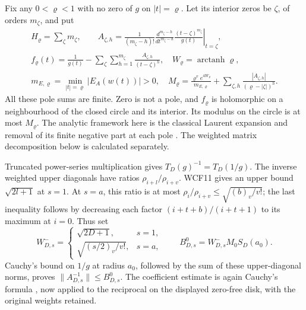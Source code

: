 Fix any $0<\varrho<1$ with no zero of $g$ on $|t|=\varrho$.
Let its interior zeros be $\zeta$, of orders $m_\zeta$, and put
\[
\begin{gathered}
 H_\varrho=\sum_\zeta m_\zeta,\qquad
 A_{\zeta,h}=\frac1{(m_\zeta-h)!}
   \left.\frac{d^{m_\zeta-h}}{dt^{m_\zeta-h}}
       \frac{(t-\zeta)^{m_\zeta}}{g(t)}\right|_{t=\zeta},\\
 f_\varrho(t)=\frac1{g(t)}-
       \sum_{\zeta}\sum_{h=1}^{m_\zeta}\frac{A_{\zeta,h}}{(t-\zeta)^h},
 \quad W_\varrho=\operatorname{arctanh}\varrho,\\
 m_{E,\varrho}=\min_{|t|=\varrho}|E_A(w(t))|>0,\quad
 M_\varrho=\frac{\varrho^ve^{4W_\varrho}}{m_{E,\varrho}}
       +\sum_{\zeta,h}\frac{|A_{\zeta,h}|}{(\varrho-|\zeta|)^h}.
\end{gathered}\tag{WCF15}
\]
All these pole sums are finite. Zero is not a pole, and $f_\varrho$
is holomorphic on a neighbourhood of the closed circle and its
interior. Its modulus on the circle is at most $M_\varrho$.
The analytic framework here is the classical Laurent expansion and
removal of its finite negative part at each pole
\cite[\S1.10(iii), eqs.~(1.10.6)--(1.10.7)]{human:dlmf1}.
The weighted matrix decomposition below is calculated separately.

Truncated power-series multiplication gives
$T_D(g)^{-1}=T_D(1/g)$. The inverse weighted upper diagonals have
ratios $\rho_{i+l}/\rho_{i+v}$. WCF11 gives an upper bound
$\sqrt{2l+1}$ at $s=1$. At $s=a$, this ratio is at most
$\rho_i/\rho_{i+v}\le\sqrt{(b)_v/v!}$; the last inequality follows
by decreasing each factor $(i+t+b)/(i+t+1)$ to its maximum at $i=0$.
Thus set
\[
 W_{D,s}^-=
 \begin{cases}\sqrt{2D+1},&s=1,\\\sqrt{(s/2)_v/v!},&s=a,
 \end{cases}
 \qquad B^0_{D,s}=W_{D,s}^-M_0S_D(a_0).
 \tag{WCF16}
\]
Cauchy's bound on $1/g$ at radius $a_0$, followed by the sum of
these upper-diagonal norms, proves $\|A_{D,s}^{-1}\|\le B^0_{D,s}$.
The coefficient estimate is again Cauchy's formula
\cite[eqs.~(1.9.30)--(1.9.31)]{human:dlmf1}, now applied to the reciprocal
on the displayed zero-free disk, with the original weights retained.

